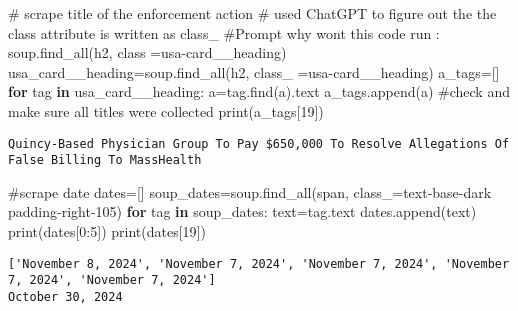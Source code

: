 \documentclass[
  letterpaper,
  DIV=11,
  numbers=noendperiod]{scrartcl}
\newenvironment{Shaded}{\begin{snugshade}}{\end{snugshade}}
\newcommand{\BuiltInTok}[1]{\textcolor[rgb]{0.00,0.23,0.31}{#1}}
\newcommand{\CommentTok}[1]{\textcolor[rgb]{0.37,0.37,0.37}{#1}}
\newcommand{\ControlFlowTok}[1]{\textcolor[rgb]{0.00,0.23,0.31}{\textbf{#1}}}
\newcommand{\DecValTok}[1]{\textcolor[rgb]{0.68,0.00,0.00}{#1}}
\newcommand{\KeywordTok}[1]{\textcolor[rgb]{0.00,0.23,0.31}{\textbf{#1}}}
\newcommand{\NormalTok}[1]{\textcolor[rgb]{0.00,0.23,0.31}{#1}}
\newcommand{\OperatorTok}[1]{\textcolor[rgb]{0.37,0.37,0.37}{#1}}
\newcommand{\StringTok}[1]{\textcolor[rgb]{0.13,0.47,0.30}{#1}}
\begin{document}
\begin{Shaded}
\begin{Highlighting}[]
\CommentTok{\# scrape title of the enforcement action }
\CommentTok{\# used ChatGPT to figure out the the class attribute is written as class\_}
\CommentTok{\#Prompt why won\textquotesingle{}t this code run : soup.find\_all(\textquotesingle{}h2\textquotesingle{}, class =\textquotesingle{}usa{-}card\_\_heading\textquotesingle{})}
\NormalTok{usa\_card\_\_heading}\OperatorTok{=}\NormalTok{soup.find\_all(}\StringTok{\textquotesingle{}h2\textquotesingle{}}\NormalTok{, class\_ }\OperatorTok{=}\StringTok{\textquotesingle{}usa{-}card\_\_heading\textquotesingle{}}\NormalTok{)}
\NormalTok{a\_tags}\OperatorTok{=}\NormalTok{[]}
\ControlFlowTok{for}\NormalTok{ tag }\KeywordTok{in}\NormalTok{ usa\_card\_\_heading:}
\NormalTok{  a}\OperatorTok{=}\NormalTok{tag.find(}\StringTok{\textquotesingle{}a\textquotesingle{}}\NormalTok{).text}
\NormalTok{  a\_tags.append(a)}
\CommentTok{\#check and make sure all titles were collected}
\BuiltInTok{print}\NormalTok{(a\_tags[}\DecValTok{19}\NormalTok{]) }
\end{Highlighting}
\end{Shaded}

\begin{verbatim}
Quincy-Based Physician Group To Pay $650,000 To Resolve Allegations Of False Billing To MassHealth
\end{verbatim}

\begin{Shaded}
\begin{Highlighting}[]
\CommentTok{\#scrape date}
\NormalTok{dates}\OperatorTok{=}\NormalTok{[]}
\NormalTok{soup\_dates}\OperatorTok{=}\NormalTok{soup.find\_all(}\StringTok{\textquotesingle{}span\textquotesingle{}}\NormalTok{, class\_}\OperatorTok{=}\StringTok{\textquotesingle{}text{-}base{-}dark padding{-}right{-}105\textquotesingle{}}\NormalTok{)}
\ControlFlowTok{for}\NormalTok{ tag }\KeywordTok{in}\NormalTok{ soup\_dates:}
\NormalTok{  text}\OperatorTok{=}\NormalTok{tag.text}
\NormalTok{  dates.append(text)}
\BuiltInTok{print}\NormalTok{(dates[}\DecValTok{0}\NormalTok{:}\DecValTok{5}\NormalTok{])}
\BuiltInTok{print}\NormalTok{(dates[}\DecValTok{19}\NormalTok{])}
\end{Highlighting}
\end{Shaded}

\begin{verbatim}
['November 8, 2024', 'November 7, 2024', 'November 7, 2024', 'November 7, 2024', 'November 7, 2024']
October 30, 2024
\end{verbatim}
\end{document}
